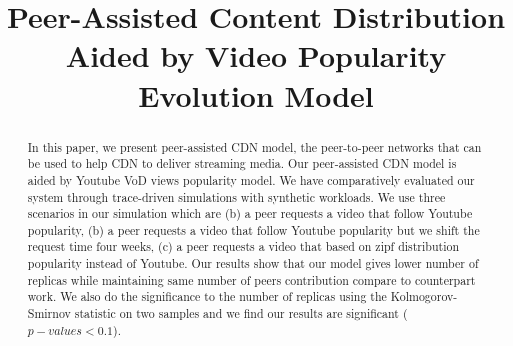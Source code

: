 \documentclass[10pt,final,journal,a4paper]{IEEEtran}
\begin{document}
%
\title{Peer-Assisted Content Distribution Aided by Video Popularity Evolution Model}

\author{
 \quad
{}
}








\maketitle


\begin{abstract}
In this paper, we present peer-assisted CDN model, the peer-to-peer networks that can be used to help CDN to deliver streaming media.
Our peer-assisted CDN model is aided by Youtube VoD views popularity model.
We have comparatively evaluated our system through trace-driven simulations with synthetic workloads.
We use three scenarios in our simulation which are (b) a peer requests a video that follow Youtube popularity, (b) a peer requests a video that follow Youtube popularity but we shift the request time four weeks, (c) a peer requests a video that based on zipf distribution popularity instead of Youtube.
Our results show that our model gives lower number of replicas while maintaining same number of peers contribution compare to counterpart work. 
We also do the significance to the number of replicas using the Kolmogorov-Smirnov statistic on two samples and we find our results are significant ($p-values < 0.1$). 

\end{abstract}
\end{document}

